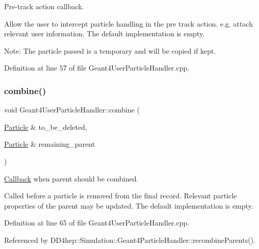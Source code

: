 Pre-\/track action callback. 

Allow the user to intercept particle handling in the pre track action. e.\+g. attach relevant user information. The default implementation is empty.

Note\+: The particle passed is a temporary and will be copied if kept. 

Definition at line 57 of file Geant4\+User\+Particle\+Handler.\+cpp.

\hypertarget{class_d_d4hep_1_1_simulation_1_1_geant4_user_particle_handler_a8951aad04c7aaeb0ba39ef9e32d372cd}{}\label{class_d_d4hep_1_1_simulation_1_1_geant4_user_particle_handler_a8951aad04c7aaeb0ba39ef9e32d372cd} 
\subsubsection{\texorpdfstring{combine()}{combine()}}
{\footnotesize\ttfamily void Geant4\+User\+Particle\+Handler\+::combine (\begin{DoxyParamCaption}\item[{\hyperlink{class_d_d4hep_1_1_simulation_1_1_geant4_user_particle_handler_a0222f326d539ff27c6c446a7a30e8e26}{Particle} \&}]{to\+\_\+be\+\_\+deleted,  }\item[{\hyperlink{class_d_d4hep_1_1_simulation_1_1_geant4_user_particle_handler_a0222f326d539ff27c6c446a7a30e8e26}{Particle} \&}]{remaining\+\_\+parent }\end{DoxyParamCaption})\hspace{0.3cm}{\ttfamily [virtual]}}



\hyperlink{class_d_d4hep_1_1_callback}{Callback} when parent should be combined. 

Called before a particle is removed from the final record. Relevant particle properties of the parent may be updated. The default implementation is empty. 

Definition at line 65 of file Geant4\+User\+Particle\+Handler.\+cpp.



Referenced by D\+D4hep\+::\+Simulation\+::\+Geant4\+Particle\+Handler\+::recombine\+Parents().

\hypertarget{class_d_d4hep_1_1_simulation_1_1_geant4_user_particle_handler_a44c00d22c0fba91cf4a32db049728805}{}\label{class_d_d4hep_1_1_simulation_1_1_geant4_user_particle_handler_a44c00d22c0fba91cf4a32db049728805} 
